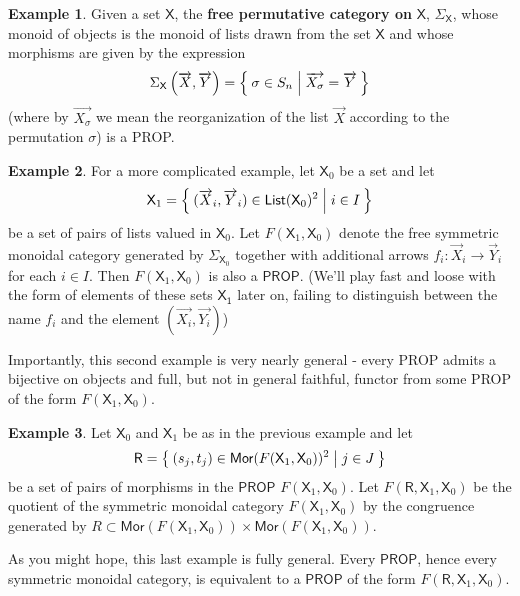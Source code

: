 \documentclass[pra,floatfix,
amsmath,superscriptaddress, 12pt]{article}
\theoremstyle{definition}
\newtheorem*{example}{Example}
\newcommand{\msf}[1]{\mathsf{#1}}
\begin{document}
\begin{example}
Given a set $\mathsf{X}$, the \textbf{free permutative category on} $\mathsf{X}$, $\Sigma_{\mathsf{X}}$, whose monoid of objects is the monoid of lists drawn from the set $\mathsf{X}$ and whose morphisms are given by the expression
\[
    \Sigma_{\mathsf{X}}\left(\overrightarrow{X},\overrightarrow{Y}\right)
    =
    \Set{\sigma \in S_{n} | \overrightarrow{X_\sigma}=\overrightarrow{Y}}
\]
(where by $\overrightarrow{X_\sigma}$ we mean the reorganization of the list $\overrightarrow{X}$ according to the permutation $\sigma$) is a \textsf{PROP}.
\end{example}

\begin{example}
For a more complicated example, let $\mathsf{X}_0$ be a set and let
\[
    \msf{X}_1
    =
    \Set{(\overrightarrow{X}_i,\overrightarrow{Y}_i) \in \mathsf{List}(\mathsf{X}_0)^2| i \in I}
\]
be a set of pairs of lists valued in $\mathsf{X}_0$. Let $F(\msf{X}_1,\msf{X}_0)$ denote the free symmetric monoidal category generated by $\Sigma_{\msf{X}_0}$ together with additional arrows $f_{i}:\overrightarrow{X}_i \longrightarrow \overrightarrow{Y}_i$ for each $i\in I$. Then $F(\msf{X}_1,\msf{X}_0)$ is also a $\msf{PROP}$. (We'll play fast and loose with the form of elements of these sets $\msf{X_1}$ later on, failing to distinguish between the name $f_i$ and the element $(\overrightarrow{X_i},\overrightarrow{Y_i})$)
\end{example}

Importantly, this second example is very nearly general - every \textsf{PROP} admits a bijective on objects and full, but not in general faithful, functor from some \textsf{PROP} of the form $F(\msf{X}_1,\msf{X}_0)$.

\begin{example}
 Let  $\msf{X}_0$ and $\msf{X}_1$ be as in the previous example and let
 \[
    \msf{R}=\Set{ (s_j,t_j) \in \mathsf{Mor}(F(\msf{X}_1,\msf{X}_0))^2 | j \in J}
 \]
 be a set of pairs of morphisms in the $\mathsf{PROP}$ $F(\msf{X}_1,\msf{X}_0)$. Let $F(\msf{R},\msf{X}_1,\msf{X}_0)$ be the quotient of the symmetric monoidal category $F(\msf{X}_1,\msf{X}_0)$ by the congruence generated by $R \subset \mathsf{Mor}(F(\msf{X}_1,\msf{X}_0)) \times \mathsf{Mor}(F(\msf{X}_1,\msf{X}_0))$.
\end{example}

As you might hope, this last example is fully general. Every $\mathsf{PROP}$, hence every symmetric monoidal category, is equivalent to a $\mathsf{PROP}$ of the form $F(\msf{R},\msf{X}_1,\msf{X}_0)$.
\end{document}
